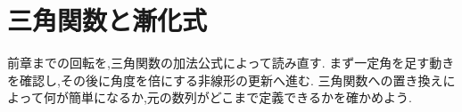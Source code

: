 \chapter{三角関数と漸化式}\label{章：三角関数と漸化式}
\begin{bookcolumns}
前章までの回転を,三角関数の加法公式によって読み直す.
まず一定角を足す動きを確認し,その後に角度を倍にする非線形の更新へ進む.
三角関数への置き換えによって何が簡単になるか,元の数列がどこまで定義できるかを確かめよう.




\end{bookcolumns}

